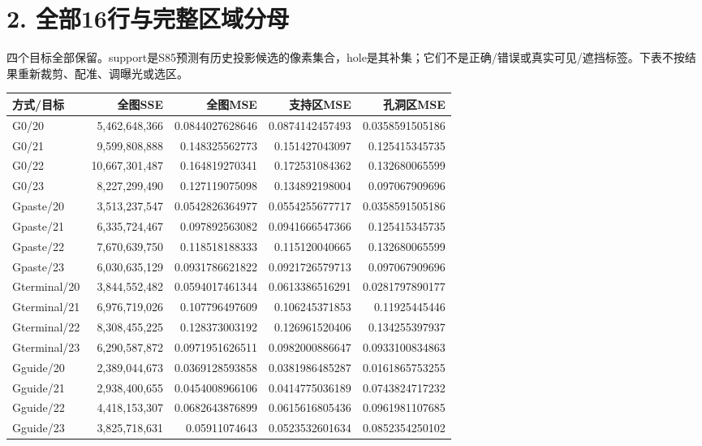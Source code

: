 \documentclass[UTF8,10pt,a4paper]{ctexart}
\begin{document}
\section*{2. 全部16行与完整区域分母}
四个目标全部保留。support是S85预测有历史投影候选的像素集合，hole是其补集；它们不是正确/错误或真实可见/遮挡标签。下表不按结果重新裁剪、配准、调曝光或选区。
\begin{center}\small\begin{tabular}{lrrrr}\toprule
方式/目标 & 全图SSE & 全图MSE & 支持区MSE & 孔洞区MSE\\\midrule
G0/20 & 5,462,648,366 & 0.0844027628646 & 0.0874142457493 & 0.0358591505186\\
G0/21 & 9,599,808,888 & 0.148325562773 & 0.151427043097 & 0.125415345735\\
G0/22 & 10,667,301,487 & 0.164819270341 & 0.172531084362 & 0.132680065599\\
G0/23 & 8,227,299,490 & 0.127119075098 & 0.134892198004 & 0.097067909696\\
Gpaste/20 & 3,513,237,547 & 0.0542826364977 & 0.0554255677717 & 0.0358591505186\\
Gpaste/21 & 6,335,724,467 & 0.097892563082 & 0.0941666547366 & 0.125415345735\\
Gpaste/22 & 7,670,639,750 & 0.118518188333 & 0.115120040665 & 0.132680065599\\
Gpaste/23 & 6,030,635,129 & 0.0931786621822 & 0.0921726579713 & 0.097067909696\\
Gterminal/20 & 3,844,552,482 & 0.0594017461344 & 0.0613386516291 & 0.0281797890177\\
Gterminal/21 & 6,976,719,026 & 0.107796497609 & 0.106245371853 & 0.11925445446\\
Gterminal/22 & 8,308,455,225 & 0.128373003192 & 0.126961520406 & 0.134255397937\\
Gterminal/23 & 6,290,587,872 & 0.0971951626511 & 0.0982000886647 & 0.0933100834863\\
Gguide/20 & 2,389,044,673 & 0.0369128593858 & 0.0381986485287 & 0.0161865753255\\
Gguide/21 & 2,938,400,655 & 0.0454008966106 & 0.0414775036189 & 0.0743824717232\\
Gguide/22 & 4,418,153,307 & 0.0682643876899 & 0.0615616805436 & 0.0961981107685\\
Gguide/23 & 3,825,718,631 & 0.05911074643 & 0.0523532601634 & 0.0852354250102\\
\bottomrule\end{tabular}\end{center}
\end{document}
